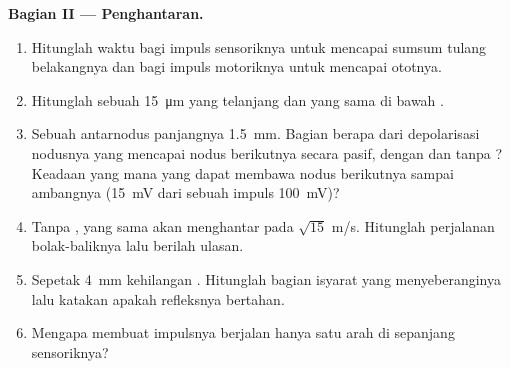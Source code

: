 \begin{problem}
\medskip
\noindent\textbf{Bagian II --- Penghantaran.}
\begin{enumerate}[resume]
  \item Hitunglah waktu bagi impuls sensoriknya untuk mencapai sumsum
        tulang belakangnya dan bagi impuls motoriknya untuk mencapai
        ototnya.
  \item Hitunglah  sebuah  \qty{15}{\micro m} yang
        telanjang dan  yang sama di bawah .
  \item Sebuah antarnodus panjangnya \qty{1.5}{mm}. Bagian berapa dari
        depolarisasi nodusnya yang mencapai nodus berikutnya secara
        pasif, dengan dan tanpa ? Keadaan yang mana yang dapat
        membawa nodus berikutnya sampai ambangnya (\qty{15}{mV} dari
        sebuah impuls \qty{100}{mV})?
  \item Tanpa ,  yang sama akan menghantar pada $\sqrt{15}$
        m/s. Hitunglah perjalanan bolak-baliknya lalu berilah ulasan.
  \item Sepetak \qty{4}{mm} kehilangan . Hitunglah bagian
        isyarat yang menyeberanginya lalu katakan apakah refleksnya
        bertahan.
  \item Mengapa  membuat impulsnya berjalan hanya
        satu arah di sepanjang  sensoriknya?
\end{enumerate}


\end{problem}
